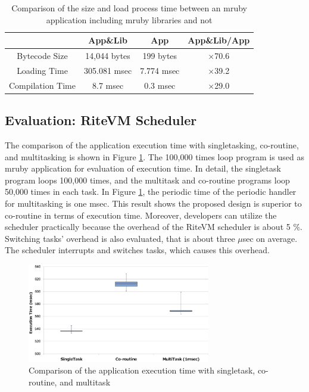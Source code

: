 \documentclass{sig-alternate-05-2015}
\begin{document}
\begin{table}[t]
    \centering
    \caption{Comparison of the size and load process time between an mruby application including mruby libraries and not}
    \scriptsize
    {\tabcolsep=0.1cm
    \begin{tabular}{c||c|c|c}
                            & App\&Lib     & App        &   App\&Lib/App  \\ \hline
          Bytecode Size     & 14,044 bytes & 199 bytes  &   $\times$70.6          \\ %
          Loading Time      & 305.081 msec & 7.774 msec &   $\times$39.2          \\
          Compilation Time  & 8.7 msec     & 0.3 msec   &   $\times$29.0          \\
    \end{tabular}
    }
    \label{tab:size_and_time}
\end{table}

\subsection{Evaluation: RiteVM Scheduler}
The comparison of the application execution time with singletasking, co-routine, and multitasking is shown in Figure \ref{fig:comparison_s_c_m}.
The 100,000 times loop program is used as mruby application for evaluation of execution time.
In detail, the singletask program loops 100,000 times, and the multitask and co-routine programs loop 50,000 times in each task.
In Figure \ref{fig:comparison_s_c_m}, the periodic time of the periodic handler for multitasking is one msec.
This result shows the proposed design is superior to co-routine in terms of execution time.
Moreover, developers can utilize the scheduler practically because the overhead of the RiteVM scheduler is about 5 \%.
Switching tasks' overhead is also evaluated, that is about three $\mu$sec on average.
The scheduler interrupts and switches tasks, which causes this overhead.

\begin{figure}[t]
    \centering
    \includegraphics[width=8cm,clip]{figure/comparison_s_c_m.eps}
    \caption{Comparison of the application execution time with singletask, co-routine, and multitask}
    \label{fig:comparison_s_c_m}
\end{figure}
\end{document}

